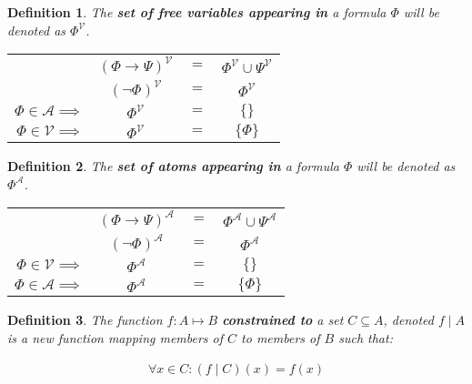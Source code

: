 \documentclass{article}
\newtheorem{defin}{Definition}
\begin{document}
\begin{defin}
The \textbf{set of free variables appearing in} a formula $\Phi$ will be denoted as $\Phi^\mathcal{V}$.
\setlength{\tabcolsep}{1pt}
\begin{center}
	\begin{tabular}{rclc}
		                               & $(\Phi \rightarrow \Psi)^\mathcal{V}$ & $=$ & $ \Phi^\mathcal{V} \cup \Psi^\mathcal{V}$ \\
		                               & $(\neg \Phi)^\mathcal{V}            $ & $=$ & $ \Phi^\mathcal{V}               $ \\
		$\Phi \in \mathcal{A} \implies$ & $\Phi^\mathcal{V}                   $ & $=$ & $ \{\}                    $ \\
		$\Phi \in \mathcal{V} \implies$ & $\Phi^\mathcal{V}                   $ & $=$ & $ \{\Phi\}                $
	\end{tabular}
\end{center}
\end{defin}

\begin{defin}
The \textbf{set of atoms appearing in} a formula $\Phi$ will be denoted as $\Phi^\mathcal{A}$.
\setlength{\tabcolsep}{1pt}
\begin{center}
	\begin{tabular}{rclc}
		                               & $(\Phi \rightarrow \Psi)^\mathcal{A}$ & $=$ & $ \Phi^\mathcal{A} \cup \Psi^\mathcal{A}$ \\
		                               & $(\neg \Phi)^\mathcal{A}            $ & $=$ & $ \Phi^\mathcal{A}               $ \\
		$\Phi \in \mathcal{V} \implies$ & $\Phi^\mathcal{A}                   $ & $=$ & $ \{\}                    $ \\
		$\Phi \in \mathcal{A} \implies$ & $\Phi^\mathcal{A}                   $ & $=$ & $ \{\Phi\}                $
	\end{tabular}
\end{center}
\end{defin}
\begin{defin}
The function $f : A \mapsto B$ \textbf{constrained to} a set $C \subseteq A$, denoted $f \mid A$ is a new function mapping
members of $C$ to members of $B$ such that:

\begin{align*}
\forall x \in C : (f \mid C) (x) = f (x)
\end{align*}
\end{defin}
\end{document}
